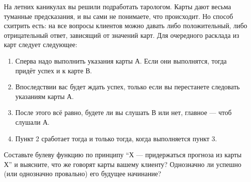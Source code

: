 \question
На летних каникулах вы решили подработать тарологом. Карты дают весьма туманные предсказания, и вы сами не понимаете, что происходит. Но способ схитрить есть: на все вопросы клиентов можно давать либо положительный, либо отрицательный ответ, зависящий от значений карт. Для очередного расклада из карт следует следующее:

\begin{enumerate}
    \item Сперва надо выполнить указания карты А. Если они выполнятся, тогда придёт успех и к карте В.
    \item Впоследствии вас будет ждать успех, только если вы перестанете следовать указаниям карты А.
    \item После этого всё равно, будете ли вы слушать В или нет, главное — чтоб слушали А.
    \item Пункт 2 сработает тогда и только тогда, когда выполняется пункт 3.
\end{enumerate}

Составьте булеву функцию по принципу “Х — придержаться прогноза из карты Х” и выясните, что же говорят карты вашему клиенту? Однозначно ли успешно (или однозначно провально) его будущее начинание?